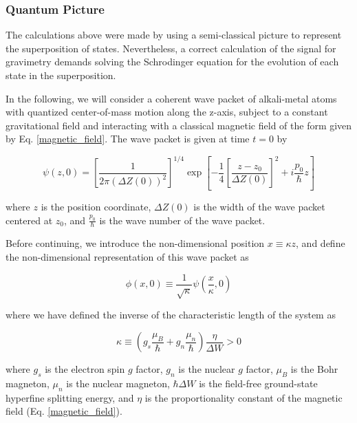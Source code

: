 \documentclass{article}
\begin{document}
\subsubsection{Quantum Picture}
The calculations above were made by using a semi-classical picture to represent the superposition of states. Nevertheless, a correct calculation of the signal for gravimetry demands solving the Schrodinger equation for the evolution of each state in the superposition. 

In the following, we will consider a coherent wave packet of alkali-metal atoms with quantized center-of-mass motion along the z-axis, subject to a constant gravitational field and interacting with a classical magnetic field of the form given by Eq. \ref{magnetic_field}. The wave packet is given at time $t=0$ by

\begin{equation}\label{wave_packet}
\psi(z,0) = 
\left[\frac{1}{2 \pi (\Delta Z(0))^2} \right]^{1/4} \exp \left[-\frac{1}{4} \left[\frac{z-z_{0}}{\Delta Z(0)}\right]^{2}  + i \frac{p_{0}}{\hbar}z \right]
\end{equation}

where $z$ is the position coordinate, $\Delta Z(0)$ is the width of the wave packet centered at $z_{0}$, and $\frac{p_{0}}{\hbar}$ is the wave number of the wave packet. 

Before continuing, we introduce the non-dimensional position $x \equiv \kappa z$, and define the non-dimensional representation of this wave packet as

\begin{equation}\label{wave_packet_non_dimensional}
\phi(x,0) \equiv \frac{1}{\sqrt{\kappa}} \psi(\frac{x}{\kappa}, 0)
\end{equation}

where we have defined the inverse of the characteristic length of the system as

\begin{equation}\label{kappa}
\kappa \equiv (g_{s}\frac{\mu_{B}}{\hbar} + g_{n}\frac{\mu_{n}}{\hbar}) \frac{\eta}{\Delta W} > 0
\end{equation}

where $g_{s}$ is the electron spin $g$ factor, $g_{n}$ is the nuclear $g$ factor, $\mu_{B}$ is the Bohr magneton, $\mu_{n}$ is the nuclear magneton, $\hbar \Delta W$ is the field-free ground-state hyperfine splitting energy, and $\eta$ is the proportionality constant of the magnetic field (Eq. \ref{magnetic_field}).
\end{document}
